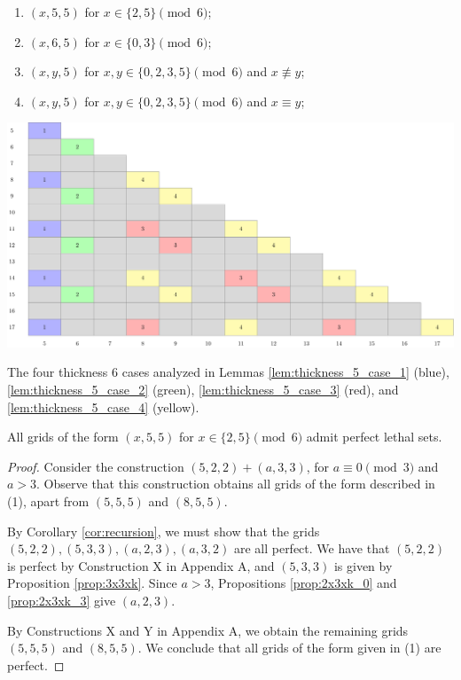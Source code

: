 \begin{enumerate}
\item $(x,5,5)$ for $x \in \{2,5\} \pmod 6$;
\item $(x,6,5)$ for $x \in \{0,3\} \pmod 6$;
\item $(x,y,5)$ for $x,y \in \{0,2,3,5\} \pmod 6$ and $x \not\equiv y$;
\item $(x,y,5)$ for $x,y \in \{0,2,3,5\} \pmod 6$ and $x \equiv y$;
\end{enumerate}

\begin{table}[]
\centering
\includegraphics[width=\textwidth]{tables/4/thickness_5_cases.pdf}
\caption{The four thickness 6 cases analyzed in Lemmas \ref{lem:thickness_5_case_1} (blue), \ref{lem:thickness_5_case_2} (green), \ref{lem:thickness_5_case_3} (red), and \ref{lem:thickness_5_case_4} (yellow).}
\label{fig:thickness_5_cases}
\end{table}


\begin{lem}
\label{lem:thickness_5_case_1}
All grids of the form $(x,5,5)$ for $x \in \{2,5\} \pmod 6$ admit perfect lethal sets.
\end{lem}

\begin{proof}
Consider the construction $(5,2,2) + (a,3,3)$, for $a \equiv 0 \pmod 3$ and $a >3$. Observe that this construction obtains all grids of the form described in (1), apart from $(5,5,5)$ and $(8,5,5)$.

By Corollary \ref{cor:recursion}, we must show that the grids $(5,2,2), (5,3,3), (a,2,3), (a,3,2)$ are all perfect. We have that $(5,2,2)$ is perfect by Construction X in Appendix A, and $(5,3,3)$ is given by Proposition \ref{prop:3x3xk}. Since $a >3$, Propositions \ref{prop:2x3xk_0} and \ref{prop:2x3xk_3} give $(a,2,3)$. 

By Constructions X and Y in Appendix A, we obtain the remaining grids $(5,5,5)$ and $(8,5,5)$. We conclude that all grids of the form given in (1) are perfect.
\end{proof}

